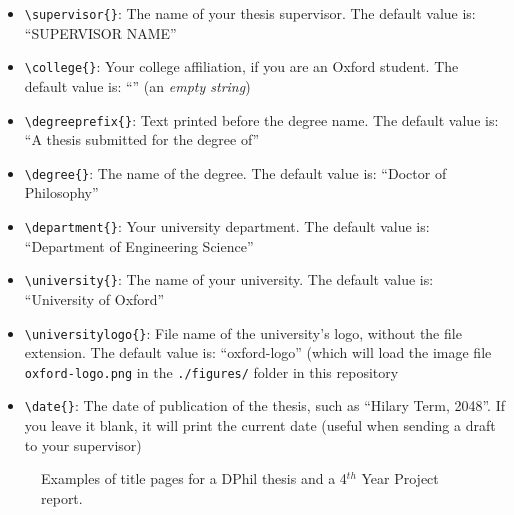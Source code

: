 \begin{itemize}

    \item \verb|\supervisor{}|: The name of your thesis supervisor. The default value is: ``SUPERVISOR NAME''

    \item \verb|\college{}|: Your college affiliation, if you are an Oxford student. The default value is: ``'' (an \textit{empty string})

    \item \verb|\degreeprefix{}|: Text printed before the degree name. The default value is: ``A thesis submitted for the degree of''

    \item \verb|\degree{}|: The name of the degree. The default value is: ``Doctor of Philosophy''

    \item \verb|\department{}|: Your university department. The default value is: ``Department of Engineering Science''

    \item \verb|\university{}|: The name of your university. The default value is: ``University of Oxford''

    \item \verb|\universitylogo{}|: File name of the university's logo, without the file extension. The default value is: ``oxford-logo'' (which will load the image file \verb|oxford-logo.png| in the \verb|./figures/| folder in this repository

    \item \verb|\date{}|: The date of publication of the thesis, such as ``Hilary Term, 2048''. If you leave it blank, it will print the current date (useful when sending a draft to your supervisor)

\end{itemize}



\begin{figure}[htb]
    \centering
    \caption[Examples of title pages for a DPhil thesis and a 4$^{th}$ Year Project report]
    {
        Examples of title pages for a  DPhil thesis and a
         4$^{th}$ Year Project report.
        \label{fig:ch0:title_page}
    }
\end{figure}


